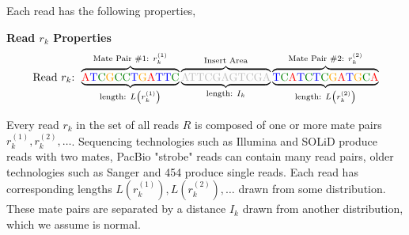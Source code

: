 \documentclass[phd,tocprelim]{cornell}
\begin{document}
\pagebreak

Each read has the following properties,
\begin{center}
\textbf{Read $r_{k}$ Properties}
\[\text{Read $r_{k}$: }\overbrace{\underbrace{\text{{\color{red} A}{\color{blue} T}{\color{MyDarkGreen} C}{\color{orange} G}{\color{MyDarkGreen} C}{\color{MyDarkGreen} C}{\color{blue} T}{\color{orange} G}{\color{red} A}{\color{blue} T}{\color{blue} T}{\color{MyDarkGreen} C}}}_{\text{length: } L\left(r_{k}^{(1)}\right) }}^{\text{Mate Pair \#1: } r_{k}^{(1)}}
\overbrace{\underbrace{\text{{\color{gray} ATTCGAGTCGA}}}_{\text{length: } I_{k} }}^{\text{Insert Area}}
\overbrace{\underbrace{\text{{\color{blue} T}{\color{MyDarkGreen} C}{\color{red} A}{\color{blue} T}{\color{MyDarkGreen} C}{\color{blue} T}{\color{MyDarkGreen} C}{\color{orange} G}{\color{red} A}{\color{blue} T}{\color{orange} G}{\color{MyDarkGreen} C}{\color{red} A}}}_{\text{length: } L\left(r_{k}^{(2)}\right) }}^{\text{Mate Pair \#2: } r_{k}^{(2)}}\]
\end{center}
Every read $r_{k}$ in the set of all reads $R$ is composed of one or more mate pairs $r_{k}^{(1)}, r_{k}^{(2)}, \ldots$. Sequencing technologies such as Illumina and SOLiD produce reads with two mates, PacBio "strobe" reads can contain many read pairs, older technologies such as Sanger and 454 produce single reads. Each read has corresponding lengths $L\left(r_{k}^{(1)}\right), L\left(r_{k}^{(2)}\right), \ldots$ drawn from some distribution. These mate pairs are separated by a distance $I_{k}$ drawn from another distribution, which we assume is normal.

\pagebreak
\end{document}

